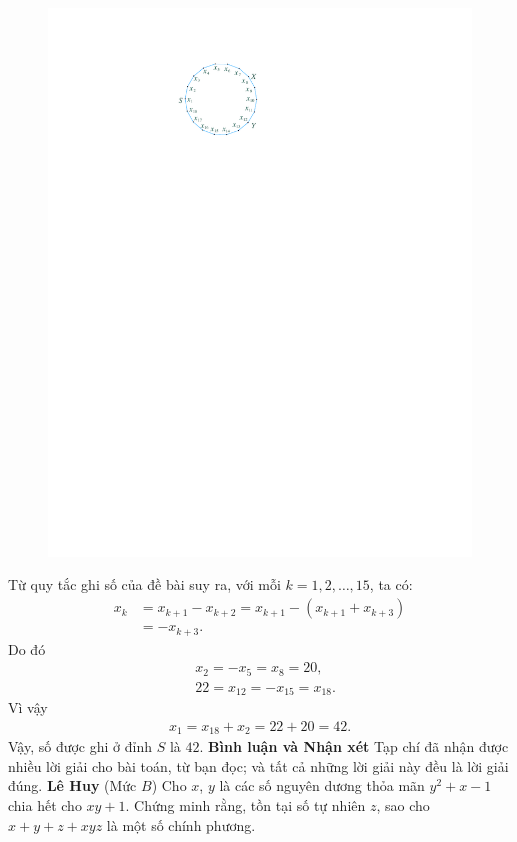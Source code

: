 \begin{multicols}{2}
\begin{figure}[H]
		\captionsetup{labelformat= empty, justification=centering}
		\includegraphics[width=0.7\linewidth]{P641}
		\vspace*{-10pt}
	\end{figure}
	Từ quy tắc ghi số của đề bài suy ra, với mỗi $k = 1, 2, \ldots, 15$, ta có:
	\begin{align*}
		{x_k} &= {x_{k + 1}} - {x_{k + 2}} = {x_{k + 1}} - \left( {{x_{k + 1}} + {x_{k + 3}}} \right) \\
		&=  - {x_{k + 3}}.
	\end{align*}
	Do đó
	\begin{align*}
		&{x_2} =  - {x_5} = {x_8} = 20,\\
		&22 = {x_{12}} =  - {x_{15}} = {x_{18}}.
	\end{align*}
	Vì vậy
	\begin{align*}
		{x_1} = {x_{18}} + {x_2} = 22 + 20 = 42.
	\end{align*}
	Vậy, số được ghi ở đỉnh $S$ là $42$.
	\vskip 0.05cm
	\textbf{\color{thachthuctoanhoc}Bình luận và Nhận xét}
	\vskip 0.05cm	
	Tạp chí đã nhận được nhiều lời giải cho bài toán, từ bạn đọc; và tất cả những lời giải này đều là lời giải đúng.
	\vskip 0.1cm
	\hfill	\textbf{\color{thachthuctoanhoc}Lê Huy}
	\vskip 0.1cm
	{}
	(Mức $B$)
	Cho $x$, $y$ là các số nguyên dương thỏa mãn $y^2 \!+\! x \!-\! 1$ chia hết cho $xy \!+\! 1$. Chứng minh rằng, tồn tại số tự nhiên $z$, sao cho $x + y + z + xyz$ là một số chính phương.

\end{multicols}
